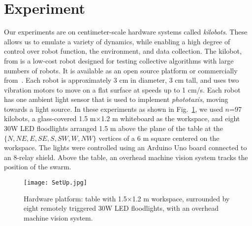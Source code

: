 
\section{Experiment}\label{sec:expResults}





Our experiments are on centimeter-scale hardware systems called \emph{kilobots}.  These allows us to emulate a variety of dynamics, while enabling a high degree of control over robot function, the environment, and data collection. The kilobot, from \cite{Rubenstein2012,rubenstein2014programmable} is a low-cost robot designed for testing collective algorithms with large numbers of robots. It is available as an open source platform or commercially from~\cite{K-Team2015}.  Each robot is approximately 3 cm in diameter, 3 cm tall, and uses two vibration motors to move on a flat surface at speeds up to 1 cm/s.  Each robot has one ambient light sensor that is used to implement \emph{phototaxis},  moving towards a light source. 
In these experiments as shown in Fig.~\ref{fig:setup}, we used $n$=97 kilobots, a glass-covered 1.5 m$\times$1.2 m whiteboard as the workspace, and eight 30W LED floodlights arranged 1.5 m above the plane of the table at the $\{N,NE,E,SE,S,SW,W,NW\}$ vertices of a 6 m square centered on the workspace. The lights were controlled using an Arduino Uno board connected to an 8-relay shield.  Above  the table, an overhead machine vision system tracks the position of the swarm.


\begin{figure}
\begin{center}
	\texttt{[image: SetUp.jpg]}
\end{center}
\vspace{-1em}
\caption{\label{fig:setup}
Hardware platform:  table with 1.5$\times$1.2 m workspace, surrounded by eight remotely triggered 30W LED floodlights, with an overhead machine vision system.
}
\vspace{-1.5em}
\end{figure}

